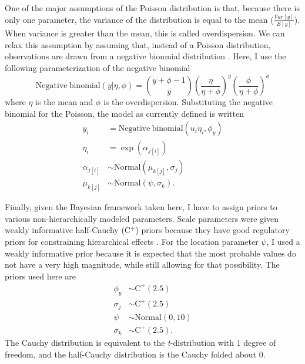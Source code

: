 \documentclass[12pt,letterpaper]{article}
\begin{document}
One of the major assumptions of the Poisson distribution is that, because there is only one parameter, the variance of the distribution is equal to the mean (\(\frac{Var[y]}{E[y]}\)). When variance is greater than the mean, this is called overdispersion. We can relax this assumption by assuming that, instead of a Poisson distribution, observations are drawn from a negative bionmial distribution \citep{Gelman2007}. Here, I use the following parameterization of the negative binomial 
\begin{equation}
  \mathrm{Negative\ binomial}(y | \eta, \phi) = {y + \phi -1 \choose y} \left(\frac{\eta}{\eta + \phi}\right)^{y} \left(\frac{\phi}{\eta + \phi}\right)^{\phi}
  \label{eq:neg_bin}
\end{equation}
where \(\eta\) is the mean and \(\phi\) is the overdispersion. Substituting the negative binomial for the Poisson, the model as currently defined is written
\begin{align}
  y_{i} &= \mathrm{Negative\ binomial}(u_{i}\eta_{i}, \phi_{y}) \nonumber \\
  \eta_{i} &= \exp(\alpha_{j[i]}) \nonumber \\
  \alpha_{j[i]} &\sim \mathrm{Normal}(\mu_{k[j]}, \sigma_{j}) \nonumber \\
  \mu_{k[j]} &\sim \mathrm{Normal}(\psi, \sigma_{k}).
  \label{eq:nb_mod}
\end{align}



Finally, given the Bayesian framework taken here, I have to assign priors to various non-hierarchically modeled parameters. Scale parameters were given weakly informative half-Cauchy (C\(^{+}\)) priors because they have good regulatory priors for constraining hierarchical effects \citep{Gelman2006,Gelman2013b}. For the location parameter \(\psi\), I used a weakly informative prior because it is expected that the most probable values do not have a very high magnitude, while still allowing for that possibility. The priors used here are
\begin{align*}
  \phi_{y} &\sim \mathrm{C}^{+}(2.5) \\
  \sigma_{j} &\sim \mathrm{C}^{+}(2.5) \\
  \psi &\sim \mathrm{Normal}(0, 10) \\
  \sigma_{k} &\sim \mathrm{C}^{+}(2.5).
\end{align*}
The Cauchy distribution is equivalent to the \textit{t}-distribution with 1 degree of freedom, and the half-Cauchy distribution is the Cauchy folded about 0.
\end{document}
